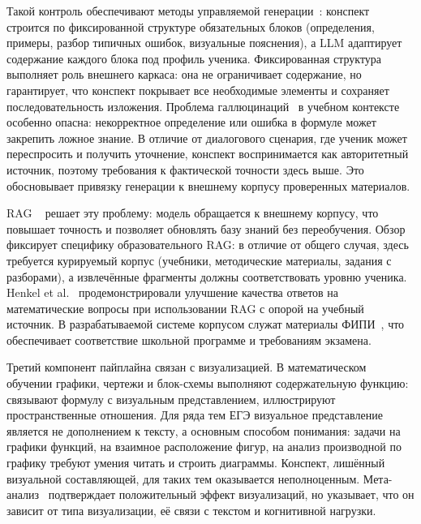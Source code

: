Такой контроль обеспечивают методы управляемой генерации~\cite{Liang2024Controllable}: конспект строится по фиксированной структуре обязательных блоков (определения, примеры, разбор типичных ошибок, визуальные пояснения), а LLM адаптирует содержание каждого блока под профиль ученика. Фиксированная структура выполняет роль внешнего каркаса: она не ограничивает содержание, но гарантирует, что конспект покрывает все необходимые элементы и сохраняет последовательность изложения. Проблема галлюцинаций~\cite{HallucinationSurvey2023} в учебном контексте особенно опасна: некорректное определение или ошибка в формуле может закрепить ложное знание. В отличие от диалогового сценария, где ученик может переспросить и получить уточнение, конспект воспринимается как авторитетный источник, поэтому требования к фактической точности здесь выше. Это обосновывает привязку генерации к внешнему корпусу проверенных материалов.

RAG ~\cite{Lewis2020RAG} решает эту проблему: модель обращается к внешнему корпусу, что повышает точность и позволяет обновлять базу знаний без переобучения. Обзор~\cite{Li2025RAGEdu} фиксирует специфику образовательного RAG: в отличие от общего случая, здесь требуется курируемый корпус (учебники, методические материалы, задания с разборами), а извлечённые фрагменты должны соответствовать уровню ученика. Henkel et al.~\cite{Henkel2024RAGMath} продемонстрировали улучшение качества ответов на математические вопросы при использовании RAG с опорой на учебный источник. В разрабатываемой системе корпусом служат материалы ФИПИ~\cite{FIPI2025Bank}, что обеспечивает соответствие школьной программе и требованиям экзамена.

Третий компонент пайплайна связан с визуализацией. В математическом обучении графики, чертежи и блок-схемы выполняют содержательную функцию: связывают формулу с визуальным представлением, иллюстрируют пространственные отношения. Для ряда тем ЕГЭ визуальное представление является не дополнением к тексту, а основным способом понимания: задачи на графики функций, на взаимное расположение фигур, на анализ производной по графику требуют умения читать и строить диаграммы. Конспект, лишённый визуальной составляющей, для таких тем оказывается неполноценным. Мета-анализ~\cite{Schoenherr2024} подтверждает положительный эффект визуализаций, но указывает, что он зависит от типа визуализации, её связи с текстом и когнитивной нагрузки.

